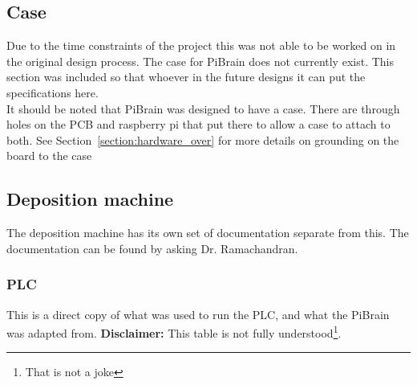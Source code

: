 \documentclass[titlepage]{article}
\begin{document}
\subsection{Case}
Due to the time constraints of the project this was not able to be worked on in the original design process. The case for PiBrain does not currently exist. This section was included so that whoever in the future designs it can put the specifications here.\\

It should be noted that PiBrain was designed to have a case. There are through holes on the PCB and raspberry pi that put there to allow a case to attach to both. See Section~\ref{section:hardware_over} for more details on grounding on the board to the case

\subsection{Deposition machine}
The deposition machine has its own set of documentation separate from this. The documentation can be found by asking Dr. Ramachandran.

\subsubsection{PLC}
This is a direct copy of what was used to run the PLC, and what the PiBrain was adapted from. \textbf{Disclaimer:} This table is not fully understood\footnote{That is not a joke}.
\end{document}
